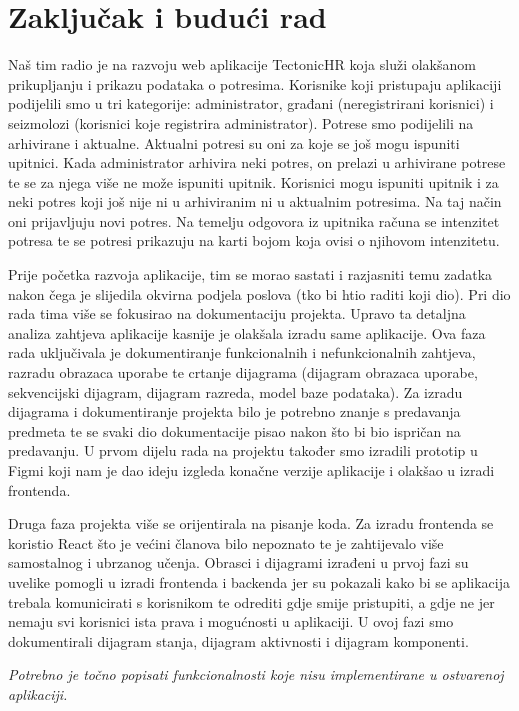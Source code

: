 \chapter{Zaključak i budući rad}
		
				Naš tim radio je na razvoju web aplikacije TectonicHR koja služi olakšanom prikupljanju i prikazu podataka o potresima. Korisnike koji pristupaju aplikaciji podijelili smo u tri kategorije: administrator, građani (neregistrirani korisnici) i seizmolozi (korisnici koje registrira administrator). Potrese smo podijelili na arhivirane i aktualne. Aktualni potresi su oni za koje se još mogu ispuniti upitnici. Kada administrator arhivira neki potres, on prelazi u arhivirane potrese te se za njega više ne može ispuniti upitnik. Korisnici mogu ispuniti upitnik i za neki potres koji još nije ni u arhiviranim ni u aktualnim potresima. Na taj način oni prijavljuju novi potres. Na temelju odgovora iz upitnika računa se intenzitet potresa te se potresi prikazuju na karti bojom koja ovisi o njihovom intenzitetu.
		
		Prije početka razvoja aplikacije, tim se morao sastati i razjasniti temu zadatka nakon čega je slijedila okvirna podjela poslova (tko bi htio raditi koji dio). Pri dio rada tima više se fokusirao na dokumentaciju projekta. Upravo ta detaljna analiza zahtjeva aplikacije kasnije je olakšala izradu same aplikacije. Ova faza rada uključivala je dokumentiranje funkcionalnih i nefunkcionalnih zahtjeva, razradu obrazaca uporabe te crtanje dijagrama (dijagram obrazaca uporabe, sekvencijski dijagram, dijagram razreda, model baze podataka). Za izradu dijagrama i dokumentiranje projekta bilo je potrebno znanje s predavanja predmeta te se svaki dio dokumentacije pisao nakon što bi bio ispričan na predavanju. U prvom dijelu rada na projektu također smo izradili prototip u Figmi koji nam je dao ideju izgleda konačne verzije aplikacije i olakšao u izradi frontenda.
		
		Druga faza projekta više se orijentirala na pisanje koda. Za izradu frontenda se koristio React što je većini članova bilo nepoznato te je zahtijevalo više samostalnog i ubrzanog
		učenja. Obrasci i dijagrami izrađeni u prvoj fazi su uvelike pomogli u izradi frontenda i backenda jer su
		pokazali kako bi se aplikacija trebala komunicirati s korisnikom te odrediti gdje smije pristupiti, a gdje ne jer nemaju svi korisnici ista prava i mogućnosti u aplikaciji. U ovoj fazi smo dokumentirali dijagram stanja, dijagram aktivnosti i dijagram komponenti. 
		
		 \textit{Potrebno je točno popisati funkcionalnosti koje nisu implementirane u ostvarenoj aplikaciji.}
		
		\eject 